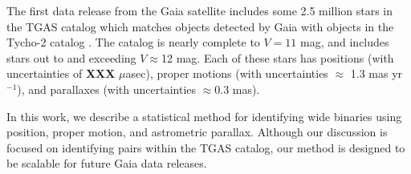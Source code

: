 \documentclass[usenatbib]{mnras}
\begin{document}
The first data release from the Gaia satellite \citep{lindegren16} includes some 2.5 million stars in the TGAS catalog which matches objects detected by Gaia with objects in the Tycho-2 catalog \citep{hog00}. The catalog is nearly complete to $V=11$ mag, and includes stars out to and exceeding $V\approx$12 mag. Each of these stars has positions (with uncertainties of {\bf XXX} $\mu$asec), proper motions (with uncertainties $\approx$ 1.3 mas yr$^{-1}$), and parallaxes (with uncertainties $\approx 0.3$ mas). 


In this work, we describe a statistical method for identifying wide binaries using position, proper motion, and astrometric parallax. Although our discussion is focused on identifying pairs within the TGAS catalog, our method is designed to be scalable for future Gaia data releases.


\end{document}
